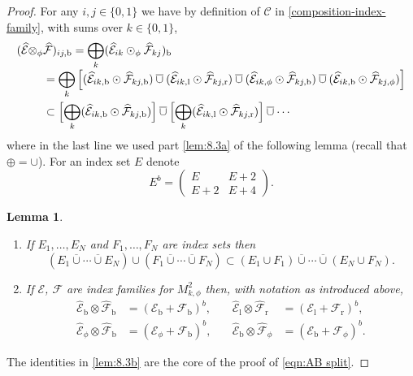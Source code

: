 \documentclass[11pt]{article}
\newcommand{\skpt}{\smallskip}
\numberwithin{equation}{section}
\newenvironment{enumeratea}
{\bgroup\def\theenumi{\alph{enumi}}\begin{enumerate}}
{\end{enumerate}\egroup}
\theoremstyle{plain}
\newtheorem{Lemma}[Th]{Lemma}
\theoremstyle{definition}
\newcommand\calE{{\mathcal E}}
\newcommand\calF{{\mathcal F}}
\newcommand{\calEwhat}{{\widehat{\calE}}}
\newcommand{\calFwhat}{{\widehat{\calF}}}
\newcommand{\bb}{{\mathrm{b}}}
\renewcommand{\ll}{{\mathrm{l}}}
\newcommand{\rr}{{\mathrm{r}}}
\newcommand{\ocup}{\mathbin{\overline{\cup}}}
\begin{document}
\begin{proof}
For any $i,j\in\{0,1\}$ we have by definition of $\mathscr{C}$ in
\eqref{composition-index-family}, with sums over $k\in\{0,1\}$,
\begin{align}
(\calEwhat \otimes_\phi& \calFwhat)_{ij,\bb}
= \bigoplus_{k} (\calEwhat_{ik} \odot_\phi \calFwhat_{kj})_\bb
\notag\\[-3pt]
& = \bigoplus_k \left[ (\calEwhat_{ik,\bb} \odot \calFwhat_{kj,\bb}) \ocup (\calEwhat_{ik,\ll} \odot \calFwhat_{kj,\rr}) \ocup (\calEwhat_{ik,\phi} \odot \calFwhat_{kj,\bb}) \ocup
(\calEwhat_{ik,\bb} \odot \calFwhat_{kj,\phi})
\right]\label{eqn:E tensor F calc}
\\
& \subset \Bigl[ \bigoplus_k (\calEwhat_{ik,\bb} \odot \calFwhat_{kj,\bb}) \Bigr] \ocup
\Bigl[ \bigoplus_k (\calEwhat_{ik,\ll} \odot \calFwhat_{kj,\rr}) \Bigr] \ocup \cdots \notag
\end{align}
where in the last line we used part \eqref{lem:8.3a} of the following lemma (recall that $\oplus=\cup$). For an index set $E$ denote\vspace*{-3pt}
\[
E^b =
\begin{pmatrix}
E & E+2\\
E+2 & E+4
\end{pmatrix}.
\]

\skpt
\begin{Lemma}\label{lem:8.3}
\begin{enumeratea}
\item\label{lem:8.3a}
If $E_1,\dots,E_N$ and $F_1,\dots,F_N$ are index sets then
\[
(E_1\ocup\cdots\ocup E_N) \cup (F_1 \ocup\cdots\ocup F_N)
\subset (E_1\cup F_1) \ocup \cdots \ocup (E_N \cup F_N).
\]
\item\label{lem:8.3b}
If $\calE$, $\calF$ are index families for $M^2_{k,\phi}$ then, with notation as introduced above,
\begin{align*}
\calEwhat_\bb\otimes \calFwhat_\bb &= (\calE_\bb+\calF_\bb)^b,\quad
&\calEwhat_\ll\otimes \calFwhat_\rr &= (\calE_\ll+\calF_\rr)^b, \\
\calEwhat_\phi\otimes \calFwhat_\bb &= (\calE_\phi+\calF_\bb)^b,\quad
& \calEwhat_\bb\otimes \calFwhat_\phi &= (\calE_\bb+\calF_\phi)^b.
\end{align*}
\end{enumeratea}
\end{Lemma}
The identities in \eqref{lem:8.3b} are the core of the proof of \eqref{eqn:AB split}.


\end{proof}
\end{document}
